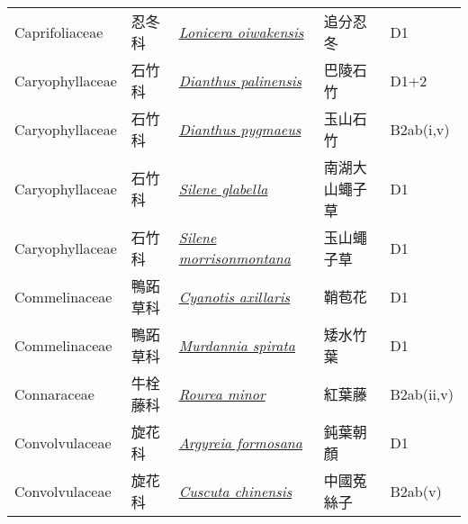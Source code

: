 {\begin{longtable}{p{2.5cm}p{2cm}p{5cm}p{2.5cm}p{3cm}}
    Caprifoliaceae & 忍冬科 & \href{http://www.theplantlist.org/tpl1.1/search?q=Lonicera+oiwakensis}{\textit{Lonicera oiwakensis} } & 追分忍冬 & D1 \index{Lonicera@\textit{Lonicera}!oiwakensis@\textit{oiwakensis}}  \index{追分忍冬} \\
    Caryophyllaceae & 石竹科 & \href{http://www.theplantlist.org/tpl1.1/search?q=Dianthus+palinensis}{\textit{Dianthus palinensis} } & 巴陵石竹 & D1+2 \index{Dianthus@\textit{Dianthus}!palinensis@\textit{palinensis}}  \index{巴陵石竹} \\
    Caryophyllaceae & 石竹科 & \href{http://www.theplantlist.org/tpl1.1/search?q=Dianthus+pygmaeus}{\textit{Dianthus pygmaeus} } & 玉山石竹 & B2ab(i,v) \index{Dianthus@\textit{Dianthus}!pygmaeus@\textit{pygmaeus}}  \index{玉山石竹} \\
    Caryophyllaceae & 石竹科 & \href{http://www.theplantlist.org/tpl1.1/search?q=Silene+glabella}{\textit{Silene glabella} } & 南湖大山蠅子草 & D1 \index{Silene@\textit{Silene}!glabella@\textit{glabella}}  \index{南湖大山蠅子草} \\
    Caryophyllaceae & 石竹科 & \href{http://www.theplantlist.org/tpl1.1/search?q=Silene+morrisonmontana}{\textit{Silene morrisonmontana} } & 玉山蠅子草 & D1 \index{Silene@\textit{Silene}!morrisonmontana@\textit{morrisonmontana}}  \index{玉山蠅子草} \\
    Commelinaceae & 鴨跖草科 & \href{http://www.theplantlist.org/tpl1.1/search?q=Cyanotis+axillaris}{\textit{Cyanotis axillaris} } & 鞘苞花 & D1 \index{Cyanotis@\textit{Cyanotis}!axillaris@\textit{axillaris}}  \index{鞘苞花} \\
    Commelinaceae & 鴨跖草科 & \href{http://www.theplantlist.org/tpl1.1/search?q=Murdannia+spirata}{\textit{Murdannia spirata} } & 矮水竹葉 & D1 \index{Murdannia@\textit{Murdannia}!spirata@\textit{spirata}}  \index{矮水竹葉} \\
    Connaraceae & 牛栓藤科 & \href{http://www.theplantlist.org/tpl1.1/search?q=Rourea+minor}{\textit{Rourea minor} } & 紅葉藤 & B2ab(ii,v) \index{Rourea@\textit{Rourea}!minor@\textit{minor}}  \index{紅葉藤} \\
    Convolvulaceae & 旋花科 & \href{http://www.theplantlist.org/tpl1.1/search?q=Argyreia+formosana}{\textit{Argyreia formosana} } & 鈍葉朝顏 & D1 \index{Argyreia@\textit{Argyreia}!formosana@\textit{formosana}}  \index{鈍葉朝顏} \\
    Convolvulaceae & 旋花科 & \href{http://www.theplantlist.org/tpl1.1/search?q=Cuscuta+chinensis}{\textit{Cuscuta chinensis} } & 中國菟絲子 & B2ab(v) \index{Cuscuta@\textit{Cuscuta}!chinensis@\textit{chinensis}}  \index{中國菟絲子} \\

\end{longtable}}

